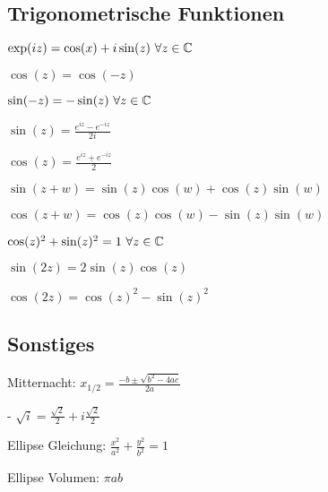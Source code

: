 \subsection{Trigonometrische Funktionen}
\begin{compactenum}
    \item $\exp(iz) = \cos(x) + i \sin(z) \ \forall z \in \mathbb{C}$
    \item
        \begin{inparaitem}
            \item $\cos(z) = \cos(-z)$
            \item $\sin(-z) = - \sin(z) \ \forall z \in \mathbb{C}$
        \end{inparaitem}
    \item
        \begin{inparaitem}
            \item $\sin(z) = \frac{e^{iz} - e^{-iz}}{2i}$
            \item $\cos(z) = \frac{e^{iz} + e^{-iz}}{2}$
        \end{inparaitem}
    \item
        \begin{inparaitem}
            \item $\sin(z + w) = \sin(z) \cos(w) + \cos(z) \sin(w)$
            \item $\cos(z + w) = \cos(z) \cos(w) - \sin(z) \sin(w)$
        \end{inparaitem}
    \item $\cos(z)^2 + \sin(z)^2 = 1 \ \forall z \in \mathbb{C}$
    \item
        \begin{inparaitem}
            \item $\sin(2z) = 2 \sin(z) \cos(z)$
            \item $\cos(2z) = \cos(z)^2 - \sin(z)^2$
        \end{inparaitem}
\end{compactenum}

\subsection{Sonstiges}
\begin{compactdesc}
    \item[Mitternacht:] $x_{1 / 2} = \frac{-b \pm \sqrt{b^2 - 4ac}}{2a}$
    \item[-] $\sqrt{i} = \frac{\sqrt{2}}{2} + i \frac{\sqrt{2}}{2}$
    \item[Ellipse Gleichung:] $\frac{x^2}{a^2} + \frac{y^2}{b^2} = 1$
    \item[Ellipse Volumen:] $\pi a b$
\end{compactdesc}

